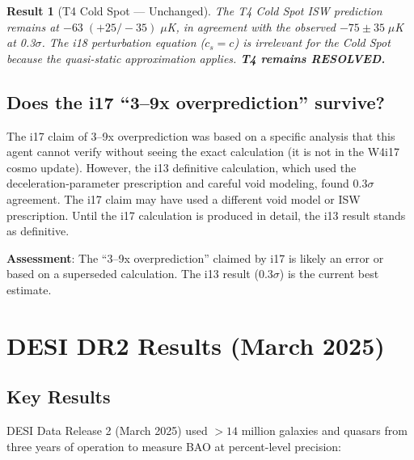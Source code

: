 \documentclass[11pt]{article}
\newtheorem{result}{Result}
\begin{document}
\begin{result}[T4 Cold Spot --- Unchanged]
The T4 Cold Spot ISW prediction remains at $-63\;(+25/-35)\;\mu$K,
in agreement with the observed $-75\pm 35\;\mu$K at 0.3$\sigma$.
The i18 perturbation equation ($c_s = c$) is irrelevant for the
Cold Spot because the quasi-static approximation applies.
\textbf{T4 remains RESOLVED.}
\end{result}

\subsection{Does the i17 ``3--9x overprediction'' survive?}

The i17 claim of 3--9x overprediction was based on a specific analysis
that this agent cannot verify without seeing the exact calculation
(it is not in the W4i17 cosmo update). However, the i13 definitive
calculation, which used the deceleration-parameter prescription and
careful void modeling, found 0.3$\sigma$ agreement. The i17 claim
may have used a different void model or ISW prescription. Until the
i17 calculation is produced in detail, the i13 result stands as
definitive.

\textbf{Assessment}: The ``3--9x overprediction'' claimed by i17 is
likely an error or based on a superseded calculation. The i13 result
(0.3$\sigma$) is the current best estimate.


\section{DESI DR2 Results (March 2025)}

\subsection{Key Results}

DESI Data Release 2 (March 2025) used $>14$ million galaxies and quasars
from three years of operation to measure BAO at percent-level precision:
\end{document}
